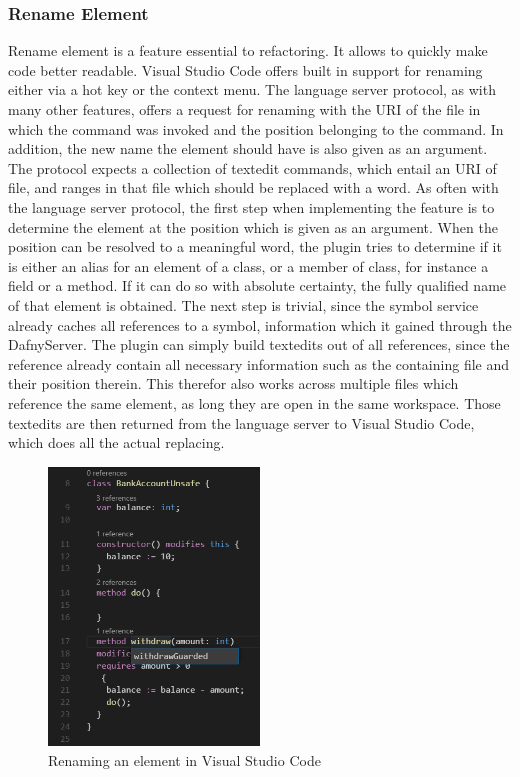 \subsubsection{Rename Element} \label{renameelement}
Rename element is a feature essential to refactoring. It allows to quickly make code better readable. Visual Studio Code offers built in support for renaming either via a hot key or the context menu. \newline
The language server protocol, as with many other features, offers a request for renaming with the URI of the file in which the command was invoked and the position belonging to the command. In addition, the new name the element should have is also given as an argument. The protocol expects a collection of textedit commands, which entail an URI of file, and ranges in that file which should be replaced with a word. \newline
As often with the language server protocol, the first step when implementing the feature is to determine the element at the position which is given as an argument. When the position can be resolved to a meaningful word, the plugin tries to determine if it is either an alias for an element of a class, or a member of class, for instance a field or a method. If it can do so with absolute certainty, the fully qualified name of that element is obtained. The next step is trivial, since the symbol service already caches all references to a symbol, information which it gained through the DafnyServer. The plugin can simply build textedits out of all references, since the reference already contain all necessary information such as the containing file and their position therein. This therefor also works across multiple files which reference the same element, as long they are open in the same workspace. Those textedits are then returned from the language server to Visual Studio Code, which does all the actual replacing. \newline
  \begin{figure}[H]
 	\centering
 	\includegraphics[width=0.5\textwidth]{img/rename}
 	\caption{Renaming an element in Visual Studio Code}
 	\label{fig:rename}
 \end{figure}
